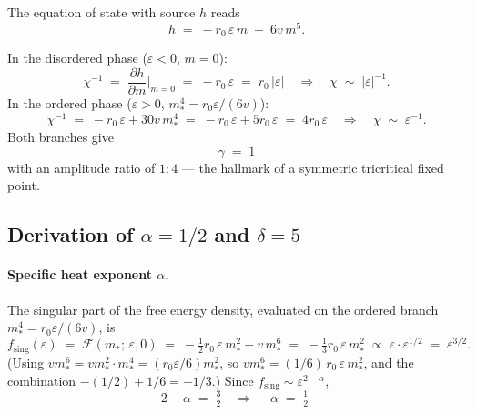 The equation of state with source $h$ reads
\begin{equation}
  h \;=\; -r_0\,\varepsilon\, m \;+\; 6 v\, m^5.
\end{equation}

In the disordered phase ($\varepsilon < 0$, $m = 0$):
\begin{equation}
  \chi^{-1} \;=\; \frac{\partial h}{\partial m}\bigg|_{m=0}
             \;=\; -r_0\,\varepsilon \;=\; r_0\,|\varepsilon|
  \quad\Longrightarrow\quad
  \chi \;\sim\; |\varepsilon|^{-1}.
\end{equation}
In the ordered phase ($\varepsilon > 0$, $m_*^4 = r_0\varepsilon/(6v)$):
\begin{equation}
  \chi^{-1} \;=\; -r_0\,\varepsilon + 30 v\, m_*^4
             \;=\; -r_0\,\varepsilon + 5 r_0\,\varepsilon
             \;=\; 4 r_0\,\varepsilon
  \quad\Longrightarrow\quad
  \chi \;\sim\; \varepsilon^{-1}.
\end{equation}
Both branches give
\begin{equation}
  \boxed{\;\gamma \;=\; 1\;}
  \label{eq:gamma-derivation}
\end{equation}
with an amplitude ratio of $1{:}4$ --- the hallmark of a symmetric tricritical
fixed point.

\subsection{Derivation of $\alpha = 1/2$ and $\delta = 5$}

\paragraph{Specific heat exponent $\alpha$.}
The singular part of the free energy density, evaluated on the ordered branch
$m_*^4 = r_0\varepsilon/(6 v)$, is
\begin{equation}
  f_{\mathrm{sing}}(\varepsilon)
  \;=\; \mathcal{F}(m_*;\,\varepsilon, 0)
  \;=\; -\tfrac{1}{2} r_0\,\varepsilon\, m_*^2 + v\, m_*^6
  \;=\; -\tfrac{1}{3} r_0\,\varepsilon\, m_*^2
  \;\propto\; \varepsilon \cdot \varepsilon^{1/2}
  \;=\; \varepsilon^{3/2}.
\end{equation}
(Using $v m_*^6 = v m_*^2 \cdot m_*^4 = (r_0\varepsilon/6) m_*^2$, so
$v m_*^6 = (1/6)\, r_0\,\varepsilon\, m_*^2$, and the combination
$-(1/2) + 1/6 = -1/3$.) Since $f_{\mathrm{sing}} \sim \varepsilon^{2-\alpha}$,
\begin{equation}
  2 - \alpha \;=\; \tfrac{3}{2}
  \quad\Longrightarrow\quad
  \boxed{\;\alpha \;=\; \tfrac{1}{2}\;}
  \label{eq:alpha-derivation}
\end{equation}

